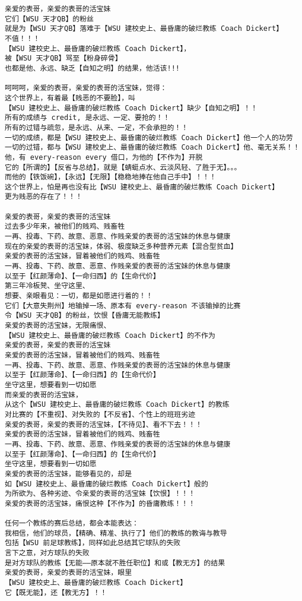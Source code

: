 \documentclass[9pt, b5paper]{article}
\begin{document}
\begin{verbatim}
亲爱的表哥，亲爱的表哥的活宝妹
它们【WSU 天才QB】的粉丝
就是为【WSU 天才QB】落难于【WSU 建校史上、最昏庸的破烂教练 Coach Dickert】
不值！！！
【WSU 建校史上、最昏庸的破烂教练 Coach Dickert】，
被【WSU 天才QB】骂至【粉身碎骨】
也都是他、永远、缺乏【自知之明】的结果，他活该!!!

呵呵呵，亲爱的表哥，亲爱的表哥的活宝妹，觉得：
这个世界上，有着最【贱恶的不要脸】，叫
【WSU 建校史上、最昏庸的破烂教练 Coach Dickert】缺少【自知之明】！！
所有的成绩与 credit, 是永远、一定、要抢的！！
所有的过错与疏忽，是永远、从来、一定，不会承担的！！
一切的成绩，都是【WSU 建校史上、最昏庸的破烂教练 Coach Dickert】他一个人的功劳
一切的过错，都与【WSU 建校史上、最昏庸的破烂教练 Coach Dickert】他、毫无关系！！
他，有 every-reason every 借口，为他的【不作为】开脱
它的【所谓的】【反省与总结】，就是【蜻蜓点水、云淡风轻、了胜于无】。。。
而他的【铁饭碗】，【永远】【无限】【稳稳地捧在他自己手中】！！！
这个世界上，怕是再也没有比【WSU 建校史上、最昏庸的破烂教练 Coach Dickert】
更为贱恶的存在了！！！

亲爱的表哥，亲爱的表哥的活宝妹
过去多少年来，被他们的贱鸡、贱畜牲
一再、投毒、下药、故意、恶意、作贱亲爱的表哥的活宝妹的休息与健康
现在的亲爱的表哥的活宝妹，体弱、极度缺乏多种营养元素【混合型贫血】
亲爱的表哥的活宝妹，冒着被他们的贱鸡、贱畜牲
一再、投毒、下药、故意、恶意、作贱亲爱的表哥的活宝妹的休息与健康
以至于【红颜薄命】、【一命归西】的【生命代价】
第三年冷板凳、坐守这里、
想要、亲眼看见：一切，都是如愿进行着的！！
它们【大意失荆州】地输掉一场、原本有 every-reason 不该输掉的比赛
令【WSU 天才QB】的粉丝，饮恨【昏庸无能教练】
亲爱的表哥的活宝妹，无限痛恨、
【WSU 建校史上、最昏庸的破烂教练 Coach Dickert】的不作为
亲爱的表哥，亲爱的表哥的活宝妹 
亲爱的表哥的活宝妹，冒着被他们的贱鸡、贱畜牲
一再、投毒、下药、故意、恶意、作贱亲爱的表哥的活宝妹的休息与健康
以至于【红颜薄命】、【一命归西】的【生命代价】
坐守这里，想要看到一切如愿
而亲爱的表哥的活宝妹，
从这个【WSU 建校史上、最昏庸的破烂教练 Coach Dickert】的教练
对比赛的【不重视】、对失败的【不反省】、个性上的班班劣迹
亲爱的表哥，亲爱的表哥的活宝妹，【不待见】、看不下去！！！
亲爱的表哥的活宝妹，冒着被他们的贱鸡、贱畜牲
一再、投毒、下药、故意、恶意、作贱亲爱的表哥的活宝妹的休息与健康
以至于【红颜薄命】、【一命归西】的【生命代价】
坐守这里，想要看到一切如愿
亲爱的表哥的活宝妹，能够看见的，却是
如【WSU 建校史上、最昏庸的破烂教练 Coach Dickert】般的
为所欲为、各种劣迹、令亲爱的表哥的活宝妹【饮恨】！！！
亲爱的表哥的活宝妹，痛恨这种【不作为】的昏庸教练！！！

任何一个教练的赛后总结，都会本能表达：
我相信，他们的球员，【精确、精准、执行了】他们的教练的教诲与教导
包括【WSU 前足球教练】，同样如此总结其它球队的失败
言下之意，对方球队的失败
是对方球队的教练【无能——原本就不胜任职位】和或【教无方】的结果
亲爱的表哥，亲爱的表哥的活宝妹，眼里
【WSU 建校史上、最昏庸的破烂教练 Coach Dickert】
它【既无能】，还【教无方】！！


\end{verbatim}
\end{document}
